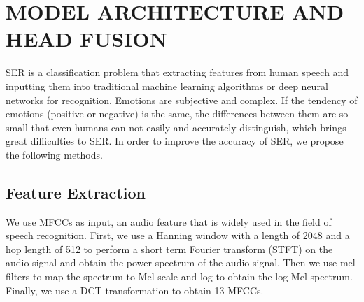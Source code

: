 \documentclass[10pt, conference, compsocconf]{IEEEtran}
\begin{document}
\section{MODEL ARCHITECTURE AND HEAD FUSION}
SER is a classification problem that extracting features from human speech and inputting them into traditional machine learning algorithms or deep neural networks for recognition. Emotions are subjective and complex. If the tendency of emotions (positive or negative) is the same, the differences between them are so small that even humans can not easily and accurately distinguish, which brings great difficulties to SER. In order to improve the accuracy of SER, we propose the following methods.
\subsection{Feature Extraction}
We use MFCCs as input, an audio feature that is widely used in the field of speech recognition. First, we use a Hanning window with a length of 2048 and a hop length of 512 to perform a short term Fourier transform (STFT) on the audio signal and obtain the power spectrum of the audio signal. Then we use mel filters to map the spectrum to Mel-scale and log to obtain the log Mel-spectrum. Finally, we use a DCT transformation to obtain 13 MFCCs.
\end{document}
